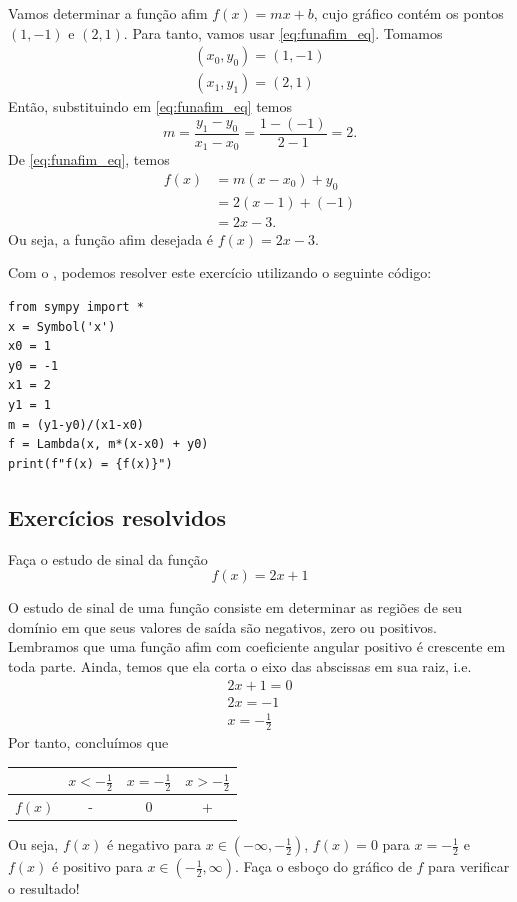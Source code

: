 \begin{ex}
  Vamos determinar a função afim $f(x) = mx + b$, cujo gráfico contém os pontos $(1, -1)$ e $(2, 1)$. Para tanto, vamos usar \eqref{eq:funafim_eq}. Tomamos
  \begin{gather}
    (x_0, y_0) = (1, -1)\\
    (x_1, y_1) = (2, 1)
  \end{gather}
  Então, substituindo em \eqref{eq:funafim_eq} temos
  \begin{equation}
    m = \frac{y_1 - y_0}{x_1 - x_0} = \frac{1 - (-1)}{2 - 1} = 2.
  \end{equation}
  De \eqref{eq:funafim_eq}, temos
  \begin{align}
    f(x) &= m(x-x_0) + y_0\\
         &= 2(x - 1) + (-1) \\
         &= 2x -3.
  \end{align}
  Ou seja, a função afim desejada é $f(x) = 2x - 3$.

  \ifispython
  Com o {\sympy}, podemos resolver este exercício utilizando o seguinte código:
\begin{verbatim}
from sympy import *
x = Symbol('x')
x0 = 1
y0 = -1
x1 = 2
y1 = 1
m = (y1-y0)/(x1-x0)
f = Lambda(x, m*(x-x0) + y0)
print(f"f(x) = {f(x)}")
\end{verbatim}
  \fi
\end{ex}

\subsection*{Exercícios resolvidos}

\begin{exeresol}
  Faça o estudo de sinal da função
  \begin{equation}
    f(x) = 2x + 1
  \end{equation}
\end{exeresol}
\begin{resol}
  O estudo de sinal de uma função consiste em determinar as regiões de seu domínio em que seus valores de saída são negativos, zero ou positivos. Lembramos que uma função afim com coeficiente angular positivo é crescente em toda parte. Ainda, temos que ela corta o eixo das abscissas em sua raiz, i.e.
  \begin{gather}
    2x + 1 = 0\\
    2x = -1\\
    x = -\frac{1}{2}
  \end{gather}
  Por tanto, concluímos que
  \begin{center}
    \begin{tabular}{l|c|c|c}
      & $x<-\frac{1}{2}$ & $x=-\frac{1}{2}$ & $x>-\frac{1}{2}$\\\hline
      $f(x)$ & - & 0 & +  
    \end{tabular}
  \end{center}
  Ou seja, $f(x)$ é negativo para $x\in(-\infty,-\frac{1}{2})$, $f(x)=0$ para $x=-\frac{1}{2}$ e $f(x)$ é positivo para $x\in (-\frac{1}{2},\infty)$. Faça o esboço do gráfico de $f$ para verificar o resultado!
\end{resol}

